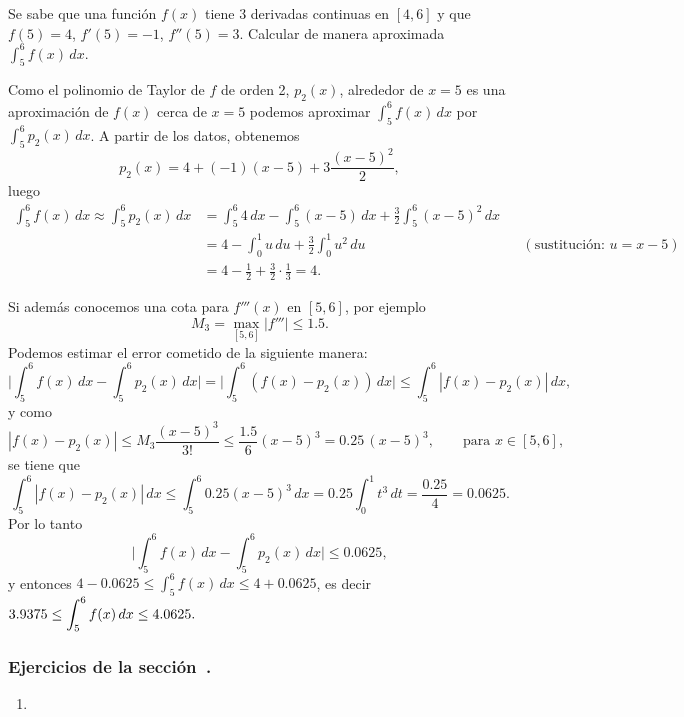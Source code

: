 \begin{example}
 Se sabe que una función $f(x)$ tiene 3 derivadas continuas en $[4,6]$ y que $f(5) = 4$, $f'(5) = -1$, $f''(5) = 3$. Calcular de manera aproximada $\int_5^6 f(x) \, dx$.

Como el polinomio de Taylor de $f$ de orden 2, $p_2(x)$, alrededor de $x=5$ es una aproximación de $f(x)$ cerca de $x=5$ podemos aproximar $\int_5^6 f(x)\, dx$ por $\int_5^6 p_2(x)\, dx$.
A partir de los datos, obtenemos
\[
 p_2(x) = 4 + (-1) (x-5) + 3 \frac{(x-5)^2}{2},
\]
luego
\[
\begin{aligned}
 \int_5^6 f(x) \, dx \approx \int_5^6 p_2(x) \, dx &= \int_5^6 4 \, dx - \int_5^6 (x-5) \, dx + \frac32 \int_5^6 (x-5)^2\, dx \\
&= 4 - \int_0^1 u \, du + \frac32 \int_0^1 u^2 \, du & &(\text{sustitución: }u = x-5) \\
&= 4 - \frac12 + \frac32 \cdot \frac13 = 4.
\end{aligned}
\]

Si además conocemos una cota para $f'''(x)$ en $[5,6]$, por ejemplo
\[
 M_3 = \max_{[5,6]} |f'''| \le 1.5.
\]
Podemos estimar el error cometido de la siguiente manera:
\[
 \Big| \int_5^6 f(x)\, dx - \int_5^6 p_2(x) \, dx \Big|
= \Big| \int_5^6 (f(x) - p_2(x)) \, dx \Big|
\le \int_5^6 |f(x) - p_2(x)| \, dx,
\]
y como 
\[
 |f(x) - p_2(x)| \le M_3 \frac{(x-5)^3}{3!} \le \frac{1.5}{6} (x-5)^3 = 0.25 \, (x-5)^3, \qquad\text{para } x \in [5,6],
\]
se tiene que
\[
 \int_5^6 |f(x) - p_2(x)|\, dx \le \int_5^6 0.25 (x-5)^3 \, dx = 0.25 \int_0^1 t^3 \, dt = \frac{0.25}{4} = 0.0625.
\]
Por lo tanto
\[
 \Big| \int_5^6 f(x)\, dx - \int_5^6 p_2(x) \, dx \Big| \le 0.0625,
\]
y entonces $ 4 - 0.0625 \le \int_5^6 f(x) \, dx \le 4 + 0.0625 $, es decir
$\displaystyle
 3.9375 \le \int_5^6 f(x) \, dx \le 4.0625.
$
 






\end{example}



\subsubsection*{Ejercicios de la sección~.}

\begin{enumerate}
\item 
\end{enumerate}

